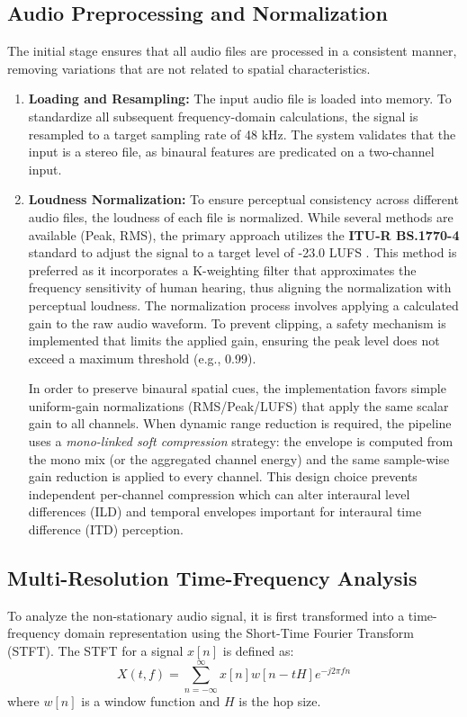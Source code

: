 \documentclass[12pt, a4paper]{article}
\begin{document}
\subsection{Audio Preprocessing and Normalization}
The initial stage ensures that all audio files are processed in a consistent manner, removing variations that are not related to spatial characteristics.
\begin{enumerate}
    \item \textbf{Loading and Resampling:} The input audio file is loaded into memory. To standardize all subsequent frequency-domain calculations, the signal is resampled to a target sampling rate of 48 kHz. The system validates that the input is a stereo file, as binaural features are predicated on a two-channel input.
    \item \textbf{Loudness Normalization:} To ensure perceptual consistency across different audio files, the loudness of each file is normalized. While several methods are available (Peak, RMS), the primary approach utilizes the \textbf{ITU-R BS.1770-4} standard to adjust the signal to a target level of -23.0 LUFS \cite{itu2015bs1770}. This method is preferred as it incorporates a K-weighting filter that approximates the frequency sensitivity of human hearing, thus aligning the normalization with perceptual loudness. The normalization process involves applying a calculated gain to the raw audio waveform. To prevent clipping, a safety mechanism is implemented that limits the applied gain, ensuring the peak level does not exceed a maximum threshold (e.g., 0.99).

    \noindent In order to preserve binaural spatial cues, the implementation favors simple uniform-gain normalizations (RMS/Peak/LUFS) that apply the same scalar gain to all channels. When dynamic range reduction is required, the pipeline uses a \emph{mono-linked soft compression} strategy: the envelope is computed from the mono mix (or the aggregated channel energy) and the same sample-wise gain reduction is applied to every channel. This design choice prevents independent per-channel compression which can alter interaural level differences (ILD) and temporal envelopes important for interaural time difference (ITD) perception.
\end{enumerate}

\subsection{Multi-Resolution Time-Frequency Analysis}
To analyze the non-stationary audio signal, it is first transformed into a time-frequency domain representation using the Short-Time Fourier Transform (STFT). The STFT for a signal $x[n]$ is defined as:
\begin{equation}
    X(t, f) = \sum_{n=-\infty}^{\infty} x[n] w[n-tH] e^{-j2\pi fn}
\end{equation}
where $w[n]$ is a window function and $H$ is the hop size.
\end{document}
